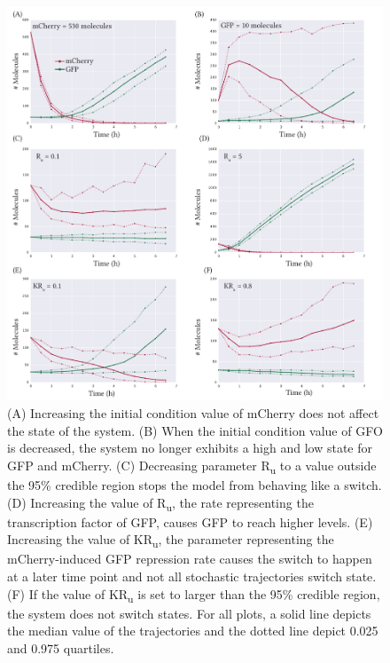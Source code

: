 \begin{figure}[htb]
\centerfloat
	\includegraphics[width=\textwidth]{../../chapters/chapterABCFlow/images/promoter_strengths.pdf}
	\caption[Changing the parameter values affects the behaviour of the switch ]{\label{fig:prom_str} (A) Increasing the initial condition value of mCherry does not affect the state of the system. (B) When the initial condition value of GFO is decreased, the system no longer exhibits a high and low state for GFP and mCherry. (C) Decreasing parameter R\textsubscript{u} to a value outside the 95\% credible region stops the model from behaving like a switch. (D) Increasing the value of R\textsubscript{u}, the rate representing the transcription factor of GFP, causes GFP to reach higher levels. (E) Increasing  the value of KR\textsubscript{u}, the parameter representing the mCherry-induced GFP repression rate causes the switch to happen at a later time point and not all stochastic trajectories switch state. (F) If the value of KR\textsubscript{u} is set to larger than the 95\% credible region, the system does not switch states. For all plots, a solid line depicts the median value of the trajectories and the dotted line depict 0.025 and 0.975 quartiles.}
\end{figure}



